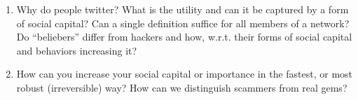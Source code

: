 \begin{enumerate}
\item Why do people twitter?  What is the utility and can it be captured by a form of social capital?  Can a single definition suffice for all members of a network?  Do ``beliebers'' differ from hackers and how, w.r.t. their forms of social capital and behaviors increasing it?
\item How can you increase your social capital or importance in the fastest, or most robust (irreversible) way?  How can we distinguish scammers from real gems?
\end{enumerate}



